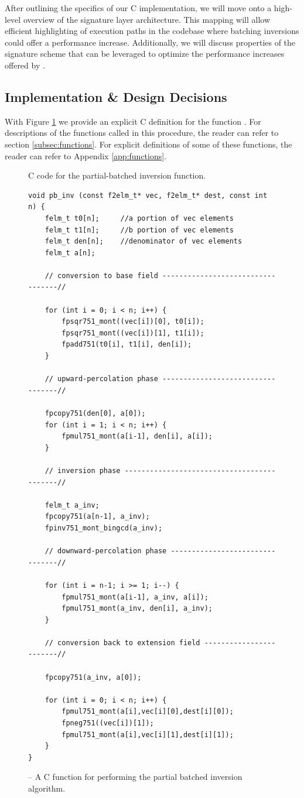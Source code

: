 After outlining the specifics of our C implementation, we will move onto a high-level overview of the signature layer architecture. This mapping will allow efficient highlighting of execution paths in the codebase where batching inversions could offer a performance increase. Additionally, we will discuss properties of the signature scheme that can be leveraged to optimize the performance increases offered by \pbinv.

\subsection{Implementation \& Design Decisions}

With Figure \ref{code:pbinv} we provide an explicit C definition for the function . For descriptions of the functions called in this procedure, the reader can refer to section \ref{subsec:functions}. For explicit definitions of some of these functions, the reader can refer to Appendix \ref{app:functions}.\\

\begin{figure}[!h]
\caption{C code for the partial-batched inversion function.}
\label{code:pbinv}
\begin{lstlisting}
void pb_inv (const f2elm_t* vec, f2elm_t* dest, const int n) {
	felm_t t0[n];     //a portion of vec elements
	felm_t t1[n];     //b portion of vec elements
	felm_t den[n];    //denominator of vec elements
	felm_t a[n];

	// conversion to base field ----------------------------------//

	for (int i = 0; i < n; i++) {
		fpsqr751_mont((vec[i])[0], t0[i]);
		fpsqr751_mont((vec[i])[1], t1[i]);
		fpadd751(t0[i], t1[i], den[i]);
	}

	// upward-percolation phase ----------------------------------//

	fpcopy751(den[0], a[0]);
	for (int i = 1; i < n; i++) {
		fpmul751_mont(a[i-1], den[i], a[i]);
	}

	// inversion phase -------------------------------------------//

	felm_t a_inv;
	fpcopy751(a[n-1], a_inv);
	fpinv751_mont_bingcd(a_inv);

	// downward-percolation phase --------------------------------//

	for (int i = n-1; i >= 1; i--) {
		fpmul751_mont(a[i-1], a_inv, a[i]);
		fpmul751_mont(a_inv, den[i], a_inv);
	}

	// conversion back to extension field ------------------------//

	fpcopy751(a_inv, a[0]);

	for (int i = 0; i < n; i++) {
		fpmul751_mont(a[i],vec[i][0],dest[i][0]);
		fpneg751((vec[i])[1]);
		fpmul751_mont(a[i],vec[i][1],dest[i][1]);
	}
}
\end{lstlisting}
\caption{\pbinv -- A C function for performing the partial batched inversion algorithm.}
\end{figure}

